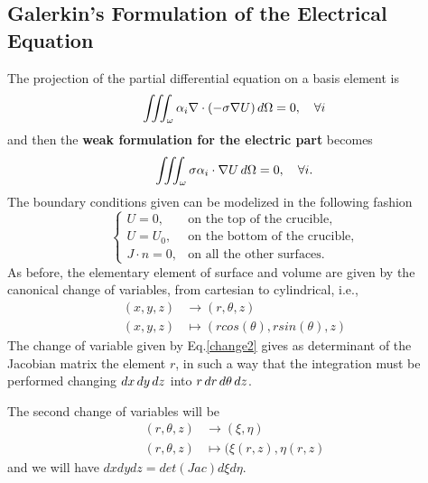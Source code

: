 



\subsection{Galerkin’s Formulation of the Electrical Equation}
The projection of the partial differential equation on a basis element is
\[\iiint_{\omega} \alpha_i \nabla\cdot(-\sigma\nabla U)\mathop{}\!d\Omega=0, \quad \forall i \]
and then the \textbf{weak formulation for the electric part} becomes
\begin{equation}
\iiint_{\omega}\sigma\alpha_i\cdot\nabla U\mathop{}\!d \Omega=0,\quad \forall i.
\end{equation}
The boundary conditions given can be modelized in the following fashion
\[\begin{cases}
	U = 0, &\text{on the top of the crucible,}\\
	U = U_0, &\text{on the bottom of the crucible,}\\
	J\cdot n=0, &\text{on all the other surfaces.}
\end{cases} \]
As before, the elementary element of surface and volume are given by the canonical change of variables, from cartesian to cylindrical, i.e., \begin{align}\label{change2}
(x,y,z)&\to(r,\theta,z)\\
(x,y,z)&\mapsto(rcos(\theta),rsin(\theta),z)\nonumber
\end{align}
The change of variable given by Eq.\ref{change2} gives as determinant of the Jacobian matrix the element $ r $, in such a way that the integration must be performed changing $ \mathop{}\!d x\mathop{}\!d y\mathop{}\!d z $ into $ r\mathop{}\!d r\mathop{}\!d\theta\mathop{}\!d z $.

The second change of variables will be 
\begin{align}\label{change3}
(r,\theta,z)&\to(\xi,\eta)\\
(r,\theta,z)&\mapsto(\xi(r,z),\eta(r,z)\nonumber
\end{align}
and we will have $ dxdydz=det(Jac)d\xi d\eta $.

